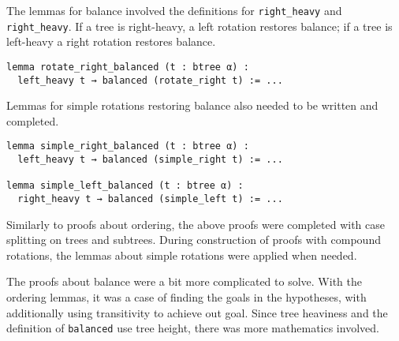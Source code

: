 The lemmas for balance involved the definitions for \lstinline{right_heavy} and \lstinline{right_heavy}. If a tree is right-heavy, a left rotation restores balance; if a tree is left-heavy a right rotation restores balance.

\begin{lstlisting}
lemma rotate_right_balanced (t : btree α) :
  left_heavy t → balanced (rotate_right t) := ...
\end{lstlisting}

Lemmas for simple rotations restoring balance also needed to be written and completed. 

\begin{lstlisting}
lemma simple_right_balanced (t : btree α) :
  left_heavy t → balanced (simple_right t) := ...
  
lemma simple_left_balanced (t : btree α) :
  right_heavy t → balanced (simple_left t) := ...
\end{lstlisting}

Similarly to proofs about ordering, the above proofs were completed with case splitting on trees and subtrees. During construction of proofs with compound rotations, the lemmas about simple rotations were applied when needed. 

The proofs about balance were a bit more complicated to solve. With the ordering lemmas, it was a case of finding the goals in the hypotheses, with additionally using transitivity to achieve out goal. Since tree heaviness and the definition of \lstinline{balanced} use tree height, there was more mathematics involved. 